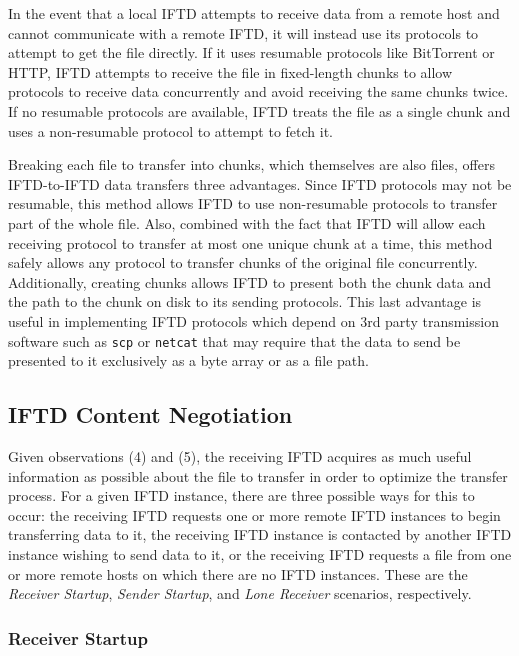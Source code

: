 In the event that a local IFTD attempts to receive data from a remote host and cannot communicate with a remote IFTD, it will instead use its protocols to attempt to get the file directly.  If it uses resumable protocols like BitTorrent or HTTP, IFTD attempts to receive the file in fixed-length chunks to allow protocols to receive data concurrently and avoid receiving the same chunks twice.  If no resumable protocols are available, IFTD treats the file as a single chunk and uses a non-resumable protocol to attempt to fetch it.

Breaking each file to transfer into chunks, which themselves are also files, offers IFTD-to-IFTD data transfers three advantages.  Since IFTD protocols may not be resumable, this method allows IFTD to use non-resumable protocols to transfer part of the whole file.  Also, combined with the fact that IFTD will allow each receiving protocol to transfer at most one unique chunk at a time, this method safely allows any protocol to transfer chunks of the original file concurrently.  Additionally, creating chunks allows IFTD to present both the chunk data and the path to the chunk on disk to its sending protocols.  This last advantage is useful in implementing IFTD protocols which depend on 3rd party transmission software such as \texttt{scp} or \texttt{netcat} that may require that the data to send be presented to it exclusively as a byte array or as a file path.

\subsection{IFTD Content Negotiation}

Given observations (4) and (5), the receiving IFTD acquires as much useful information as possible about the file to transfer in order to optimize the transfer process.  For a given IFTD instance, there are three possible ways for this to occur:  the receiving IFTD requests one or more remote IFTD instances to begin transferring data to it, the receiving IFTD instance is contacted by another IFTD instance wishing to send data to it, or the receiving IFTD requests a file from one or more remote hosts on which there are no IFTD instances.  These are the \textit{Receiver Startup}, \textit{Sender Startup}, and \textit{Lone Receiver} scenarios, respectively.

\subsubsection{Receiver Startup}

